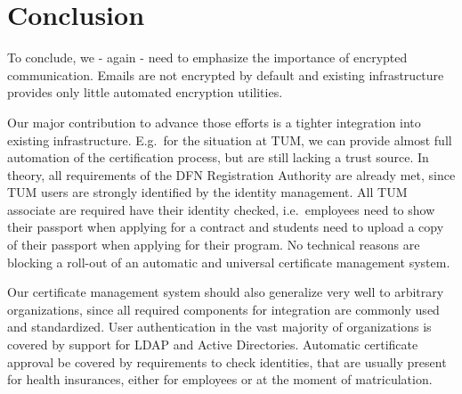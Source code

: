 \begin{abstract}
    
\end{abstract}

\begin{otherlanguage}{ngerman}
    \begin{abstract}
        
    \end{abstract}
\end{otherlanguage}

\setcounter{tocdepth}{1}
\tableofcontents
\listoffigures

\startcontent











\chapter{Conclusion}\label{ch:conclusion}
To conclude, we - again - need to emphasize the importance of encrypted communication.
Emails are not encrypted by default and existing infrastructure provides only little automated encryption utilities.

Our major contribution to advance those efforts is a tighter integration into existing infrastructure.
E.g.\ for the situation at TUM, we can provide almost full automation of the certification process, but are still
lacking a trust source.
In theory, all requirements of the DFN Registration Authority are already met, since TUM users are strongly identified
by the identity management.
All TUM associate are required have their identity checked, i.e.\ employees need to show their passport when applying for
a contract and students need to upload a copy of their passport when applying for their program.
No technical reasons are blocking a roll-out of an automatic and universal certificate management system.

Our certificate management system should also generalize very well to arbitrary organizations, since all required
components for integration are commonly used and standardized.
User authentication in the vast majority of organizations is covered by support for LDAP and Active Directories.
Automatic certificate approval be covered by requirements to check identities, that are usually present for health
insurances, either for employees or at the moment of matriculation.

